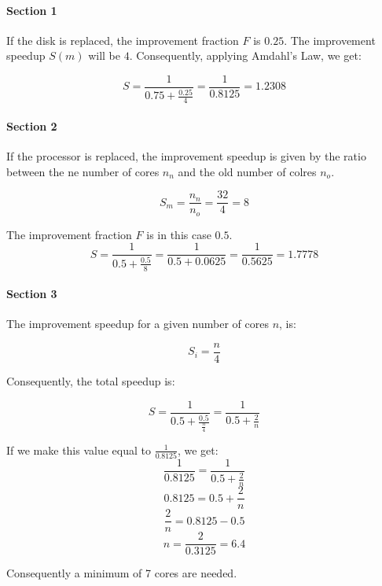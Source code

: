

\begin{comparchsol}
\end{comparchsol}

\paragraph{Section 1}
If the disk is replaced, the improvement fraction $F$ is $0.25$.
The improvement speedup $S(m)$ will be $4$.
Consequently, applying Amdahl's Law, we get:

\[
S = \frac{1}{0.75 + \frac{0.25}{4}} = \frac{1}{0.8125} =  1.2308
\]

\paragraph{Section 2}
If the processor is replaced, the improvement speedup is given by the ratio
between the ne number of cores $n_n$ and the old number of colres $n_o$.

\[
S_m = \frac{n_n}{n_o} = \frac{32}{4} = 8
\]

The improvement fraction $F$ is in this case $0.5$.
\[
S = \frac{1}{0.5 + \frac{0.5}{8}} = \frac{1}{0.5 + 0.0625} = \frac{1}{0.5625} = 1.7778
\]

\paragraph{Section 3}
The improvement speedup for a given number of cores $n$, is:

\[
S_i = \frac{n}{4}
\]

Consequently, the total speedup is:

\[
S = \frac{1}{0.5 + 
\frac{0.5}{\frac{n}{4}}} = 
\frac{1}{0.5 + \frac{2}{n}}
\]

If we make this value equal to $\frac{1}{0.8125}$, we get:
\[
\frac{1}{0.8125} = \frac{1}{0.5+\frac{2}{n}}
\]
\[ 0.8125 = 0.5 + \frac{2}{n} \]
\[ \frac{2}{n} = 0.8125 - 0.5 \]
\[ n = \frac{2}{0.3125} = 6.4 \]

Consequently a minimum of 7 cores are needed.
